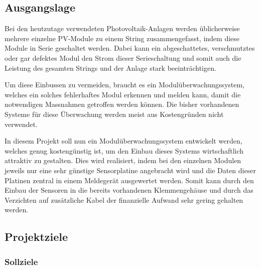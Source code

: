 \subsection{Ausgangslage}

Bei  den heutzutage  verwendeten  Photovoltaik-Anlagen werden  \"ublicherweise
mehrere einzelne PV-Module zu einem String zusammengefasst, indem diese Module
in Serie geschaltet werden. Dabei  kann ein abgeschattetes, verschmutztes oder
gar defektes Modul den Strom dieser Serieschaltung und somit auch die Leistung
des gesamten Strings und der Anlage stark beeintr\"achtigen.

Um  diese Einbussen  zu vermeiden,  braucht es  ein Modul\"uberwachungssystem,
welches ein  solches fehlerhaftes  Modul erkennen und  melden kann,  damit die
notwendigen  Massnahmen  getroffen  werden  k\"onnen. Die  bisher  vorhandenen
Systeme  f\"ur  diese \"Uberwachung  werden  meist  aus Kostengr\"unden  nicht
verwendet.

In diesem  Projekt soll  nun ein Modul\"uberwachungssystem  entwickelt werden,
welches genug kosteng\"unstig ist, um den Einbau dieses Systems wirtschaftlich
attraktiv zu gestalten. Dies wird realisiert,  indem bei den einzelnen Modulen
jeweils nur eine  sehr g\"unstige Sensorplatine angebracht wird  und die Daten
dieser Platinen  zentral in einem Meldeger\"at  ausgewertet werden. Somit kann
durch den Einbau der Sensoren  in die bereits vorhandenen Klemmengeh\"ause und
durch  das Verzichten  auf zus\"atzliche  Kabel der  finanzielle Aufwand  sehr
gering gehalten werden.


\subsection{Projektziele}

\subsubsection{Sollziele}

